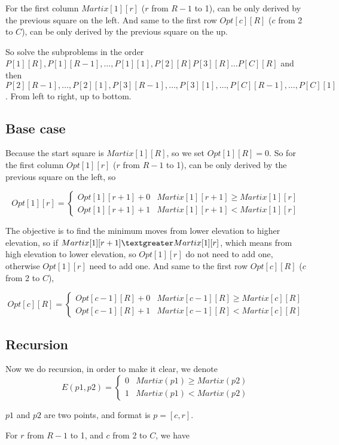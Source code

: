 \documentclass[a4paper]{article}
\begin{document}
	For the first column $Martix[1][r]$ ($r$ from $R-1$ to 1), can be only derived by the previous square on the left. And same to the first row $Opt[c][R]$ ($c$ from 2 to $C$), can be only derived by the previous square on the up.
	
	So solve the subproblems in the order $P[1][R], P[1][R-1], \dots, P[1][1], P[2][R] P[3][R]\dots P[C][R]$ and then $P[2][R-1], \dots, P[2][1], P[3][R-1], \dots, P[3][1], \dots, P[C][R-1], \dots, P[C][1]$. From left to right, up to bottom.
	\subsection*{Base case}
	Because the start square is $Martix[1][R]$, so we set $Opt[1][R] = 0$. So for the first column $Opt[1][r]$ ($r$ from $R-1$ to 1), can be only derived by the previous square on the left, so
	
		$$Opt[1][r]=
		\begin{cases}
		Opt[1][r+1] + 0   & Martix[1][r+1] \geq Martix[1][r]\\
		Opt[1][r+1] + 1   & Martix[1][r+1] < Martix[1][r]
		\end{cases}$$
		
	The objective is to find the minimum moves from lower elevation to higher elevation, so if $Martix[1][r+1] \textgreater Martix[1][r]$, which means from high elevation to lower elevation, so $Opt[1][r]$ do not need to add one, otherwise $Opt[1][r]$ need to add one. And same to the first row $Opt[c][R]$ ($c$ from 2 to $C$),
		
		$$Opt[c][R]=
		\begin{cases}
		Opt[c-1][R] + 0   & Martix[c-1][R] \geq Martix[c][R]\\
		Opt[c-1][R] + 1   & Martix[c-1][R] < Martix[c][R]
		\end{cases}$$
	\subsection*{Recursion}
			
	Now we do recursion, in order to make it clear, we denote
		$$E(p1, p2)=
		\begin{cases}
		0   & Martix(p1) \geq Martix(p2)\\
		1   & Martix(p1) < Martix(p2)
		\end{cases}$$
	
	$p1$ and $p2$ are two points, and format is $p = [c,r]$.

		
	For $r$ from $R-1$ to 1, and $c$ from 2 to $C$, we have 
	
\end{document}
